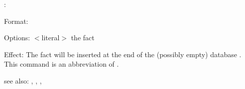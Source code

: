 \azfact:

Format: 

Options: $<$literal$>$ the fact

Effect: The fact  will be inserted at the end of the (possibly empty) 
	database . 
	This command is an abbreviation of .

see also: \az, \consult, \destroy, \replace
